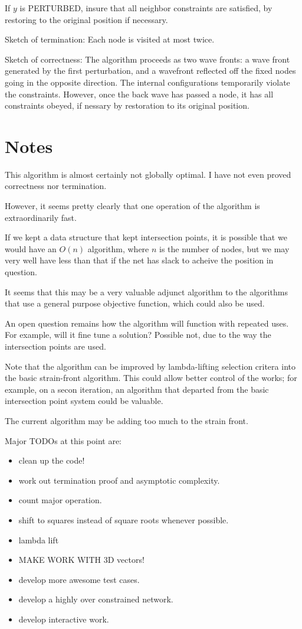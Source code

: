 \documentclass[11pt]{article}
\begin{document}
If $y$ is PERTURBED, insure that all neighbor constraints are satisfied, by restoring
to the original position if necessary.



Sketch of termination:
Each node is visited at most twice.

Sketch of correctness:
The algorithm proceeds as two wave fronts: a wave front generated by the first perturbation,
and a wavefront reflected off the fixed nodes going in the opposite direction. The
internal configurations temporarily violate the constraints.  However, once the back
wave has passed a node, it has all constraints obeyed, if nessary by restoration to its
original position.

\section{Notes}

This algorithm is almost certainly not globally optimal.  I have not even proved correctness
nor termination.

However, it seems pretty clearly that one operation of the algorithm is extraordinarily fast.

If we kept a data structure that kept intersection points, it is possible that we would
have an $O(n)$ algorithm, where $n$ is the number of nodes, but we may very well have
less than that if the net has slack to acheive the position in question.

It seems that this may be a very valuable adjunct algorithm to the algorithms that
use a general purpose objective function, which could also be used.

An open question remains how the algorithm will function with repeated uses.
For example, will it fine tune a solution?  Possible not, due to the way the
intersection points are used.

Note that the algorithm can be improved by lambda-lifting selection critera into
the basic strain-front algorithm. This could allow better control of the  works;
for example, on a secon iteration, an algorithm that departed from the basic
intersection point system could be valuable.

The current algorithm may be adding too much to the strain front.

Major TODOs at this point are:
\begin{itemize}
\item clean up the code!
\item work out termination proof and asymptotic complexity.
\item count major operation.
\item shift to squares instead of square roots whenever possible.
\item lambda lift
\item MAKE WORK WITH 3D vectors!
\item develop more awesome test cases.
  \item develop a highly over constrained network.
  \item develop interactive work.
  \end{itemize}
\end{document}
